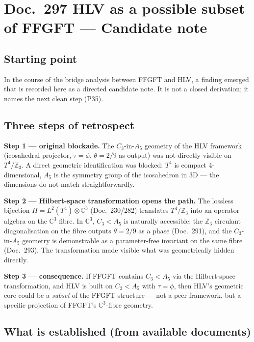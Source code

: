 
\section*{Doc.~297 \quad HLV as a possible subset of FFGFT ---
Candidate note}

\subsection*{Starting point}

In the course of the bridge analysis between FFGFT and HLV, a finding
emerged that is recorded here as a directed candidate note. It is not a
closed derivation; it names the next clean step (P35).

\subsection*{Three steps of retrospect}

\textbf{Step 1 --- original blockade.} The $C_3$-in-$A_5$ geometry of the
HLV framework (icosahedral projector, $\tau = \phi$, $\theta = 2/9$ as
output) was not directly visible on $T^4/\mathbb{Z}_3$. A direct geometric
identification was blocked: $T^4$ is compact 4-dimensional, $A_5$ is the
symmetry group of the icosahedron in 3D --- the dimensions do not match
straightforwardly.

\textbf{Step 2 --- Hilbert-space transformation opens the path.} The
lossless bijection $H = L^2(T^4)\otimes\mathbb{C}^3$ (Doc.~230/282)
translates $T^4/\mathbb{Z}_3$ into an operator algebra on the
$\mathbb{C}^3$ fibre. In $\mathbb{C}^3$, $C_3 < A_5$ is naturally
accessible: the $\mathbb{Z}_3$ circulant diagonalisation on the fibre
outputs $\theta = 2/9$ as a phase (Doc.~291), and the $C_3$-in-$A_5$
geometry is demonstrable as a parameter-free invariant on the same fibre
(Doc.~293). The transformation made visible what was geometrically hidden
directly.

\textbf{Step 3 --- consequence.} If FFGFT contains $C_3 < A_5$ via the
Hilbert-space transformation, and HLV is built on $C_3 < A_5$ with
$\tau = \phi$, then HLV's geometric core could be a \emph{subset} of the
FFGFT structure --- not a peer framework, but a specific projection of
FFGFT's $\mathbb{C}^3$-fibre geometry.

\subsection*{What is established (from available documents)}

